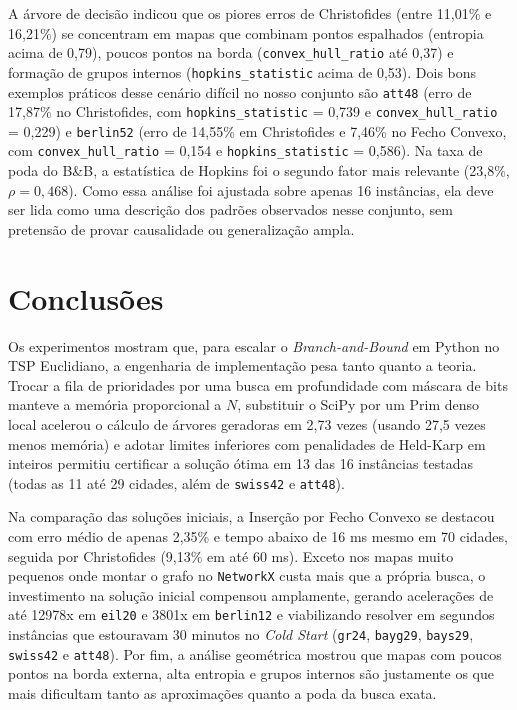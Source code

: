 \documentclass[12pt]{article}
\begin{document}
A árvore de decisão indicou que os piores erros de Christofides (entre 11,01\% e 16,21\%) se concentram em mapas que combinam pontos espalhados (entropia acima de 0,79), poucos pontos na borda (\texttt{convex\_hull\_ratio} até 0,37) e formação de grupos internos (\texttt{hopkins\_statistic} acima de 0,53). Dois bons exemplos práticos desse cenário difícil no nosso conjunto são \texttt{att48} (erro de 17,87\% no Christofides, com \texttt{hopkins\_statistic} = 0,739 e \texttt{convex\_hull\_ratio} = 0,229) e \texttt{berlin52} (erro de 14,55\% em Christofides e 7,46\% no Fecho Convexo, com \texttt{convex\_hull\_ratio} = 0,154 e \texttt{hopkins\_statistic} = 0,586). Na taxa de poda do B\&B, a estatística de Hopkins foi o segundo fator mais relevante (23,8\%, $\rho = 0,468$). Como essa análise foi ajustada sobre apenas 16 instâncias, ela deve ser lida como uma descrição dos padrões observados nesse conjunto, sem pretensão de provar causalidade ou generalização ampla.

\section{Conclusões}

Os experimentos mostram que, para escalar o \textit{Branch-and-Bound} em Python no TSP Euclidiano, a engenharia de implementação pesa tanto quanto a teoria. Trocar a fila de prioridades por uma busca em profundidade com máscara de bits manteve a memória proporcional a $N$, substituir o SciPy por um Prim denso local acelerou o cálculo de árvores geradoras em 2,73 vezes (usando 27,5 vezes menos memória) e adotar limites inferiores com penalidades de Held-Karp em inteiros permitiu certificar a solução ótima em 13 das 16 instâncias testadas (todas as 11 até 29 cidades, além de \texttt{swiss42} e \texttt{att48}).

Na comparação das soluções iniciais, a Inserção por Fecho Convexo se destacou com erro médio de apenas 2,35\% e tempo abaixo de 16 ms mesmo em 70 cidades, seguida por Christofides (9,13\% em até 60 ms). Exceto nos mapas muito pequenos onde montar o grafo no \texttt{NetworkX} custa mais que a própria busca, o investimento na solução inicial compensou amplamente, gerando acelerações de até 12978x em \texttt{eil20} e 3801x em \texttt{berlin12} e viabilizando resolver em segundos instâncias que estouravam 30 minutos no \textit{Cold Start} (\texttt{gr24}, \texttt{bayg29}, \texttt{bays29}, \texttt{swiss42} e \texttt{att48}). Por fim, a análise geométrica mostrou que mapas com poucos pontos na borda externa, alta entropia e grupos internos são justamente os que mais dificultam tanto as aproximações quanto a poda da busca exata.
\end{document}

